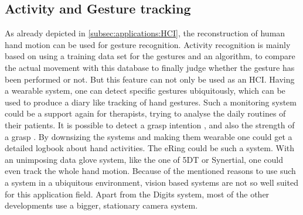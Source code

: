 \subsection{Activity and Gesture tracking} \label{subsec:applications:activity}

As already depicted in \ref{subsec:applications:HCI}, the reconstruction of human hand motion can be used for gesture recognition. Activity recognition is mainly based on using a training data set for the gestures and an algorithm, to compare the actual movement with this database to finally judge whether the gesture has been performed or not. But this feature can not only be used as an \ac{HCI}. Having a wearable system, one can detect specific gestures ubiquitously, which can be used to produce a diary like tracking of hand gestures. Such a monitoring system could be a support again for therapists, trying to analyse the daily routines of their patients. It is possible to detect a grasp intention \cite{supuk2008evaluation}, \cite{zhang2011framework} and also the strength of a grasp \cite{ekvall2005grasp}. By downsizing the systems and making them wearable one could get a detailed logbook about hand activities. The eRing \cite{wilhelm2015ering} could be such a system. With an unimposing data glove system, like the one of 5DT or Synertial, one could even track the whole hand motion. Because of the mentioned reasons to use such a system in a ubiquitous environment, vision based systems are not so well suited for this application field. Apart from the Digits \cite{Digits} system, most of the other developments use a bigger, stationary camera system.\\
